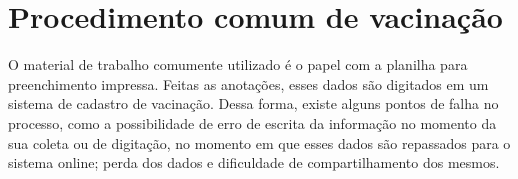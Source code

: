 
\label{Cap:Problema}


\section{Procedimento comum de vacinação}
\label{Sec:ProcedimentoComumVacinacao}
O material de trabalho comumente utilizado é o papel com a planilha para preenchimento impressa. Feitas as anotações, esses dados são digitados em um sistema de cadastro de vacinação. Dessa forma, existe alguns pontos de falha no processo, como a possibilidade de erro de escrita da informação no momento da sua coleta ou de digitação, no momento em que esses dados são repassados para o sistema online; perda dos dados e dificuldade de compartilhamento dos mesmos.






